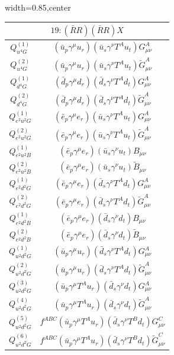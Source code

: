 \begin{table}[H]
\begin{center}
\begin{adjustbox}{width=0.85\textwidth,center}
\begin{minipage}[t]{6.1cm}
\begin{tabular}[t]{c|c}
\multicolumn{2}{c}{\boldmath$19:(\bar R R)(\bar R R)X$} \\
\hline
$Q_{u^4G}^{(1)}$  &  $(\bar u_p \gamma^\mu u_r) (\bar u_s \gamma^\nu T^A u_t) G^A_{\mu\nu}$ \\
%
$Q_{u^4G}^{(2)}$  &  $(\bar u_p \gamma^\mu u_r) (\bar u_s \gamma^\nu T^A u_t) \widetilde G^A_{\mu\nu}$ \\
%
$Q_{d^4G}^{(1)}$  &  $(\bar d_p \gamma^\mu d_r) (\bar d_s \gamma^\nu T^A d_t) G^A_{\mu\nu}$ \\
%
$Q_{d^4G}^{(2)}$  &  $(\bar d_p \gamma^\mu d_r) (\bar d_s \gamma^\nu T^A d_t) \widetilde G^A_{\mu\nu}$ \\
%
$Q_{e^2u^2G}^{(1)}$  &  $(\bar e_p \gamma^\mu e_r)(\bar u_s \gamma^\nu T^A u_t) G_{\mu\nu}^A$ \\
%
$Q_{e^2u^2G}^{(2)}$  &  $(\bar e_p \gamma^\mu e_r)(\bar u_s \gamma^\nu T^A u_t) \widetilde G_{\mu\nu}^A$ \\
%
$Q_{e^2u^2B}^{(1)}$  &  $(\bar e_p \gamma^\mu e_r)(\bar u_s \gamma^\nu u_t) B_{\mu\nu}$ \\
%
$Q_{e^2u^2B}^{(2)}$  &  $(\bar e_p \gamma^\mu e_r)(\bar u_s \gamma^\nu u_t) \widetilde B_{\mu\nu}$ \\
%
$Q_{e^2d^2G}^{(1)}$  &  $(\bar e_p \gamma^\mu e_r)(\bar d_s \gamma^\nu T^A d_t) G_{\mu\nu}^A$ \\
%
$Q_{e^2d^2G}^{(2)}$  &  $(\bar e_p \gamma^\mu e_r)(\bar d_s \gamma^\nu T^A d_t) \widetilde G_{\mu\nu}^A$ \\
%
$Q_{e^2d^2B}^{(1)}$  &  $(\bar e_p \gamma^\mu e_r)(\bar d_s \gamma^\nu d_t) B_{\mu\nu}$ \\
%
$Q_{e^2d^2B}^{(2)}$  &  $(\bar e_p \gamma^\mu e_r)(\bar d_s \gamma^\nu d_t) \widetilde B_{\mu\nu}$ \\
%
$Q_{u^2d^2G}^{(1)}$  &  $(\bar u_p \gamma^\mu u_r)(\bar d_s \gamma^\nu T^A d_t) G_{\mu\nu}^A$ \\
%
$Q_{u^2d^2G}^{(2)}$  &  $(\bar u_p \gamma^\mu u_r)(\bar d_s \gamma^\nu T^A d_t) \widetilde G_{\mu\nu}^A$ \\
%
$Q_{u^2d^2G}^{(3)}$  &  $(\bar u_p \gamma^\mu T^A u_r)(\bar d_s \gamma^\nu d_t) G_{\mu\nu}^A$ \\
%
$Q_{u^2d^2G}^{(4)}$  &  $(\bar u_p \gamma^\mu T^A u_r)(\bar d_s \gamma^\nu d_t) \widetilde G_{\mu\nu}^A$ \\
%
$Q_{u^2d^2G}^{(5)}$  &  $f^{ABC} (\bar u_p \gamma^\mu T^A u_r)(\bar d_s \gamma^\nu T^B d_t) G_{\mu\nu}^C$ \\
%
$Q_{u^2d^2G}^{(6)}$  &  $f^{ABC} (\bar u_p \gamma^\mu T^A u_r)(\bar d_s \gamma^\nu T^B d_t) \widetilde G_{\mu\nu}^C$ \\

\end{tabular}
\end{minipage}
\end{adjustbox}
\end{center}
\end{table}
